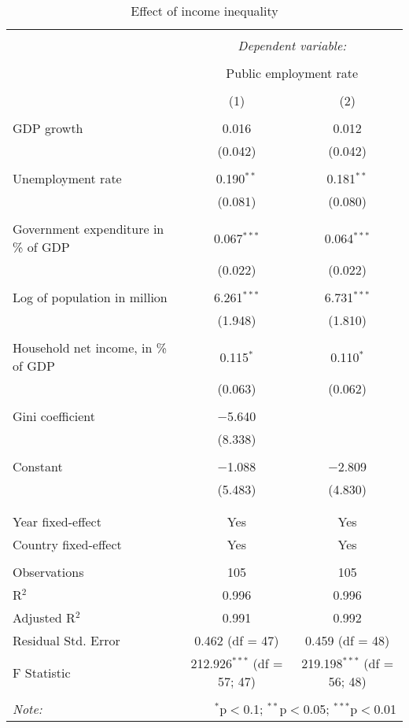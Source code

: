 
\begin{table}[!htbp] \centering 
  \caption{Effect of income inequality} 
  \label{} 
\begin{tabular}{@{\extracolsep{5pt}}lcc} 
\\[-1.8ex]\hline 
\hline \\[-1.8ex] 
 & \multicolumn{2}{c}{\textit{Dependent variable:}} \\ 
\cline{2-3} 
\\[-1.8ex] & \multicolumn{2}{c}{Public employment rate} \\ 
\\[-1.8ex] & (1) & (2)\\ 
\hline \\[-1.8ex] 
 GDP growth & 0.016 & 0.012 \\ 
  & (0.042) & (0.042) \\ 
  & & \\ 
 Unemployment rate & 0.190$^{**}$ & 0.181$^{**}$ \\ 
  & (0.081) & (0.080) \\ 
  & & \\ 
 Government expenditure in \% of GDP & 0.067$^{***}$ & 0.064$^{***}$ \\ 
  & (0.022) & (0.022) \\ 
  & & \\ 
 Log of population in million & 6.261$^{***}$ & 6.731$^{***}$ \\ 
  & (1.948) & (1.810) \\ 
  & & \\ 
 Household net income, in \% of GDP & 0.115$^{*}$ & 0.110$^{*}$ \\ 
  & (0.063) & (0.062) \\ 
  & & \\ 
 Gini coefficient & $-$5.640 &  \\ 
  & (8.338) &  \\ 
  & & \\ 
 Constant & $-$1.088 & $-$2.809 \\ 
  & (5.483) & (4.830) \\ 
  & & \\ 
\hline \\[-1.8ex] 
Year fixed-effect & Yes & Yes \\ 
Country fixed-effect & Yes & Yes \\ 
\hline \\[-1.8ex] 
Observations & 105 & 105 \\ 
R$^{2}$ & 0.996 & 0.996 \\ 
Adjusted R$^{2}$ & 0.991 & 0.992 \\ 
Residual Std. Error & 0.462 (df = 47) & 0.459 (df = 48) \\ 
F Statistic & 212.926$^{***}$ (df = 57; 47) & 219.198$^{***}$ (df = 56; 48) \\ 
\hline 
\hline \\[-1.8ex] 
\textit{Note:}  & \multicolumn{2}{r}{$^{*}$p$<$0.1; $^{**}$p$<$0.05; $^{***}$p$<$0.01} \\ 
\end{tabular} 
\end{table} 
